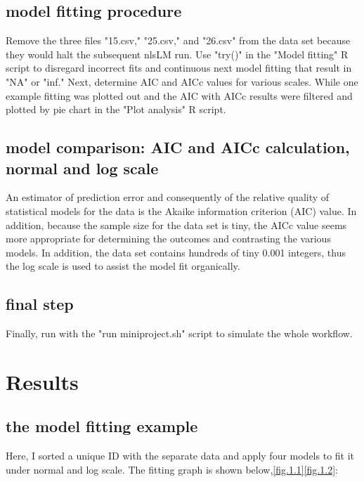 \documentclass[11pt]{article}
\begin{document}
\subsection{model fitting procedure}
Remove the three files "15.csv," "25.csv," and "26.csv" from the data set because they would halt the subsequent nlsLM run. Use "try()" in the "Model fitting" R script to disregard incorrect fits and continuous next model fitting that result in "NA" or "inf." Next, determine AIC and AICc values for various scales. While one example fitting was plotted out and the AIC with AICc results were filtered and plotted by pie chart in the "Plot analysis" R script.

\subsection{model comparison: AIC and AICc calculation, normal and log scale}
An estimator of prediction error and consequently of the relative quality of statistical models for the data is the Akaike information criterion (AIC) value. In addition, because the sample size for the data set is tiny, the AICc value seems more appropriate for determining the outcomes and contrasting the various models. In addition, the data set contains hundreds of tiny 0.001 integers, thus the log scale is used to assist the model fit organically\citep{burnham2004multimodel}.

\subsection{ final step}
Finally, run with the "run miniproject.sh" script to simulate the whole workflow.

\section{Results}
\subsection{the model fitting example}
Here, I sorted a unique ID with the separate data and apply four models to fit it under normal and log scale. The fitting graph is shown below,\ref{fig.1.1}\ref{fig.1.2}:
\end{document}
